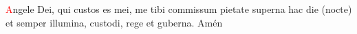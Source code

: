 \textcolor{red}{A}ngele Dei, qui custos es mei, me tibi commissum pietate superna hac die (nocte) et semper illumina, custodi, rege et guberna. Amén